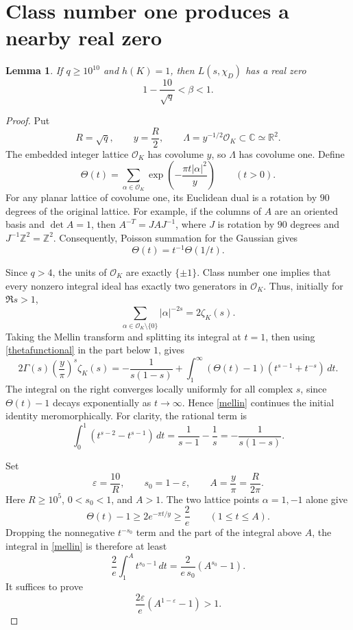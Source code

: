 \documentclass[11pt]{article}
\newtheorem{lemma}[theorem]{Lemma}
\newcommand{\Z}{\mathbb Z}
\newcommand{\OK}{\mathcal O_K}
\newcommand{\zK}{\zeta_K}
\newcommand{\tht}{\Theta}
\newcommand{\norm}[1]{\lvert #1\rvert}
\begin{document}
\section{Class number one produces a nearby real zero}

\begin{lemma}\label{zero}
If \(q\ge10^{10}\) and \(h(K)=1\), then \(L(s,\chi_D)\) has a real zero
\[
 1-\frac{10}{\sqrt q}<\beta<1.
\]
\end{lemma}

\begin{proof}
Put
\[
 R=\sqrt q,\qquad y=\frac R2,\qquad
 \Lambda=y^{-1/2}\OK\subset\mathbb C\simeq\mathbb R^2.
\]
The embedded integer lattice \(\OK\) has covolume \(y\), so
\(\Lambda\) has covolume one. Define
\[
 \tht(t)=\sum_{\alpha\in\OK}
       \exp\left(-\frac{\pi t\norm{\alpha}^2}{y}\right)
       \qquad(t>0).
\]
For any planar lattice of covolume one, its Euclidean dual is a
rotation by \(90\) degrees of the original lattice. For example, if
the columns of \(A\) are an oriented basis and \(\det A=1\), then
\(A^{-T}=JAJ^{-1}\), where \(J\) is rotation by \(90\) degrees
and \(J^{-1}\Z^2=\Z^2\).
Consequently, Poisson summation for the Gaussian gives
\begin{equation}\label{thetafunctional}
 \tht(t)=t^{-1}\tht(1/t).
\end{equation}

Since \(q>4\), the units of \(\OK\) are exactly \(\{\pm1\}\).
Class number one implies that every nonzero integral ideal has
exactly two generators in \(\OK\). Thus, initially for \(\Re s>1\),
\[
 \sum_{\alpha\in\OK\setminus\{0\}}\norm{\alpha}^{-2s}
     =2\zK(s).
\]
Taking the Mellin transform and splitting its integral at \(t=1\),
then using \eqref{thetafunctional} in the part below \(1\), gives
\begin{equation}\label{mellin}
 2\Gamma(s)\left(\frac y\pi\right)^s\zK(s)
 =
 -\frac{1}{s(1-s)}
 +\int_1^\infty(\tht(t)-1)
       \left(t^{s-1}+t^{-s}\right)\,dt .
\end{equation}
The integral on the right converges locally uniformly for all complex
\(s\), since \(\tht(t)-1\) decays exponentially as \(t\to\infty\).
Hence \eqref{mellin} continues the initial identity meromorphically.
For clarity, the rational term is
\[
 \int_0^1(t^{s-2}-t^{s-1})\,dt
 =\frac{1}{s-1}-\frac1s=-\frac{1}{s(1-s)}.
\]

Set
\[
 \varepsilon=\frac{10}{R},\qquad s_0=1-\varepsilon,\qquad
 A=\frac y\pi=\frac{R}{2\pi}.
\]
Here \(R\ge10^5\), \(0<s_0<1\), and \(A>1\).
The two lattice points \(\alpha=1,-1\) alone give
\[
 \tht(t)-1\ge2e^{-\pi t/y}\ge\frac2e
       \qquad(1\le t\le A).
\]
Dropping the nonnegative \(t^{-s_0}\) term and the part of the integral
above \(A\), the integral in \eqref{mellin} is therefore at least
\[
 \frac2e\int_1^A t^{s_0-1}\,dt
    =\frac{2}{e\,s_0}(A^{s_0}-1).
\]
It suffices to prove
\begin{equation}\label{target}
 \frac{2\varepsilon}{e}(A^{1-\varepsilon}-1)>1.
\end{equation}


\end{proof}
\end{document}

